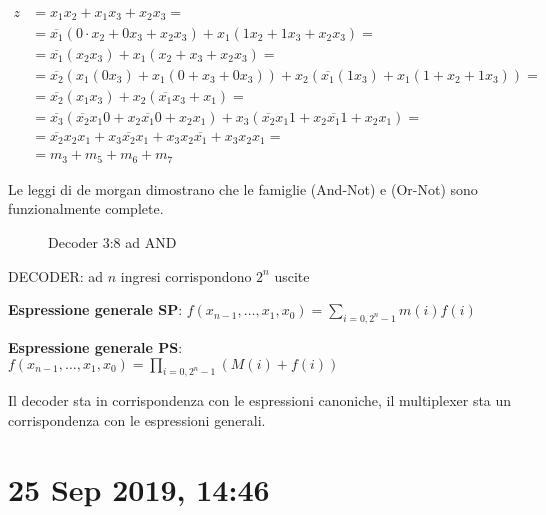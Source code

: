 \documentclass{article}
\begin{document}
\[
    \begin{split}
        z &= x_1 x_2 + x_1 x_3 + x_2 x_3 = \\
         &= \overline{x_1} ( 0 \cdot x_2 + 0 x_3 + x_2 x_3) + x_1 (1 x_2 + 1 x_3 + x_2 x_3) = \\
         &= \overline{x_1} (x_2 x_3) + x_1 (x_2 + x_3 + x_2 x_3) = \\
         &= \overline{x_2} (x_1 (0 x_3) + x_1 (0 + x_3 + 0 x_3)) + x_2 (\overline{x_1} (1 x_3) + x_1 (1 + x_2 + 1 x_3)) =\\
         &= \overline{x_2} (x_1 x_3) + x_2 (\overline{x_1} x_3 + x_1) =\\
         &= \overline{x_3} (\overline{x_2} x_1 0 + x_2 \overline{x_1} 0 + x_2 x_1) + x_3 (\overline{x_2} x_1 1 + x_2 \overline{x_1} 1 + x_2 x_1) =\\
         &= \overline{x_2} x_2 x_1 + x_3 \overline{x_2} x_1 + x_3 x_2 \overline{x_1} + x_3 x_2 x_1 =\\
         &= m_3 + m_5 + m_6 + m_7
  \end{split}
  \]


Le leggi di de morgan dimostrano che le famiglie (And-Not) e (Or-Not) sono funzionalmente complete.

\begin{figure}[ht]
    
    \centering
    \caption{Decoder 3:8 ad AND}
\end{figure}

DECODER: ad $n$ ingresi corrispondono $2^n$ uscite


\textbf{Espressione generale SP}: $f(x_{n-1}, \ldots, x_1, x_0) = \sum_{i=0, 2^n -1} m(i) f(i)$

\textbf{Espressione generale PS}: $f(x_{n-1}, \ldots, x_1, x_0) = \prod_{i=0, 2^n -1} (M(i) +f(i))$

Il decoder sta in corrispondenza con le espressioni canoniche, il multiplexer sta un corrispondenza con le espressioni generali.


\newpage
\section{25 Sep 2019, 14:46}
\end{document}
